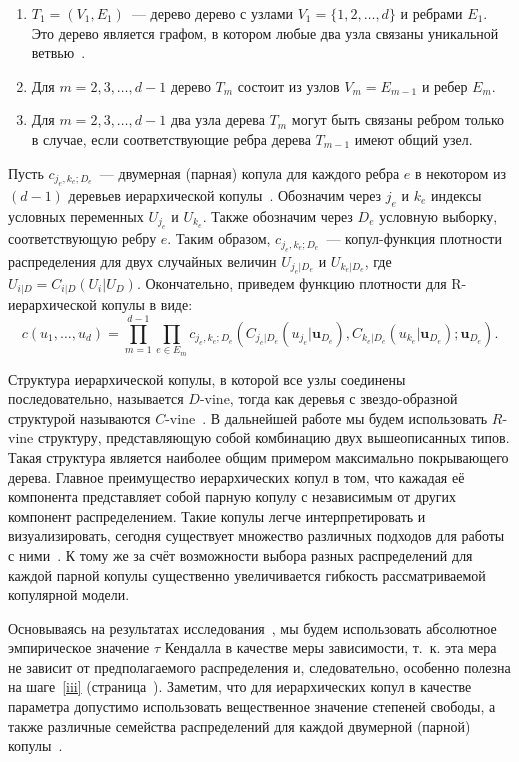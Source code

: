 \begin{enumerate}[label=(\arabic*),labelwidth=1cm,leftmargin=1cm]
\item $T_1 = (V_1, E_1)$~--- дерево дерево с узлами $V_1 = \{1, 2, \ldots, d\}$ и ребрами $E_1$. 
Это дерево является графом, в котором любые два узла связаны уникальной ветвью~\cite{Diestel2005}.
\item Для $m = 2, 3,\ldots,d - 1$ дерево $T_m$ состоит из узлов $V_m = E_{m-1}$ и ребер $E_m$.
\item \label{iii} Для $m = 2, 3,\ldots, d - 1$ два узла дерева $T_m$ могут быть связаны ребром только в случае, если соответствующие ребра дерева $T_{m-1}$ имеют общий узел.
\end{enumerate}

Пусть $c_{j_e, k_e; D_e}$~--- двумерная (парная) копула для каждого ребра $e$ в некотором из $(d - 1)$ деревьев иерархической копулы~\cite{Czado2010}. 
Обозначим через $j_e$ и $k_e$ индексы условных переменных $U_{j_e}$ и $U_{k_e}$. 
Также обозначим через $D_e$ условную выборку, соответствующую ребру $e$. 
Таким образом, $c_{j_e, k_e; D_e}$~--- копул-функция плотности распределения для двух случайных величин $U_{j_e|D_e}$ и $U_{k_e|D_e}$, где $U_{i|D} = C_{i|D} (U_i|U_D)$. 
Окончательно, приведем функцию плотности для R-иерархической копулы в виде:
\begin{equation}
    c(u_1, \ldots, u_d) = \prod_{m=1}^{d-1} \prod_{e \in E_m} c_{j_e,k_e;D_e} \left( C_{j_e|D_e} (u_{j_e}|\textbf{u}_{D_e}), C_{k_e|D_e} (u_{k_e}|\textbf{u}_{D_e}); \textbf{u}_{D_e} \right).
\end{equation}

Структура иерархической копулы, в которой все узлы соединены последовательно, называется $D$-vine, тогда как деревья с звездо-образной структурой называются $C$-vine~\cite{Dissmann2013}. 
В дальнейшей работе мы будем использовать $R$-vine структуру, представляющую собой комбинацию двух вышеописанных типов. 
Такая структура является наиболее общим примером максимально покрывающего дерева.
Главное преимущество иерархических копул в том, что кажадая её компонента представляет собой парную копулу с независимым от других компонент распределением.
Такие копулы легче интерпретировать и визуализировать, сегодня существует множество различных подходов для работы с ними~\cite{Cooke2015, Czado2010, Dissmann2013}. 
К тому же за счёт возможности выбора разных распределений для каждой парной копулы существенно увеличивается гибкость рассматриваемой копулярной модели.

Основываясь на результатах исследования~\cite{Dissmann2013}, мы будем использовать абсолютное эмпирическое значение $\tau$ Кендалла в качестве меры зависимости, т.~к. эта мера не зависит от предполагаемого распределения и, следовательно, особенно полезна на шаге~\ref{iii} (страница~\pageref{iii}).
Заметим, что для иерархических копул в качестве параметра допустимо использовать вещественное значение степеней свободы, %
а также различные семейства распределений для каждой двумерной (парной) копулы~\cite{Bel2010}.

